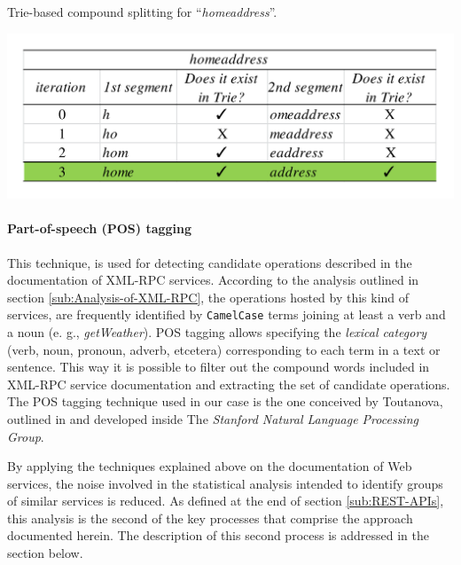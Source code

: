 \begin{table}
\caption{Trie-based compound splitting for \textquotedblleft{}\emph{homeaddress}\textquotedblright{}.}


\center\includegraphics[scale=0.5]{images/example-trie-spellchecking-en}\label{trie-example}
\end{table}



\paragraph{Part-of-speech (POS) tagging}
\label{parag:part-of-speech}
This technique, is used for detecting candidate operations described in the documentation of XML-RPC services. According to the analysis outlined in section \ref{sub:Analysis-of-XML-RPC}, the operations hosted by this kind of services, are frequently identified by \texttt{CamelCase} terms joining at least a verb and a noun (e. g., \emph{getWeather}). POS tagging allows specifying the \emph{lexical category} (verb, noun, pronoun, adverb, etcetera) corresponding to each term in a text or sentence. This way it is possible to filter out the compound words included in XML-RPC service documentation and extracting the set of candidate operations. The POS tagging technique used in our case is the one conceived by Toutanova, outlined in \cite{Toutanova:2003} and developed inside The \emph{Stanford Natural Language Processing Group}.

By applying the techniques explained above on the documentation of Web services, the noise involved in the statistical analysis intended
to identify groups of similar services is reduced. As defined at the end of section \ref{sub:REST-APIs}, this analysis is the second of the key processes that comprise the approach documented herein. The description of this second process is addressed in the section below.